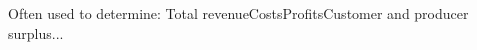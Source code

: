 \documentclass[preview]{standalone}
\begin{document}
\begin{center}
Often used to determine: Total revenueCostsProfitsCustomer and producer surplus...
\end{center}
\end{document}
